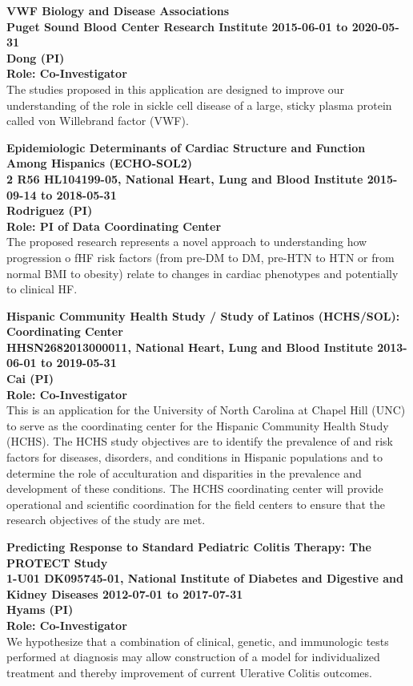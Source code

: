 \documentclass[10pt,letterpaper]{article}
\renewenvironment{itemize}{
  \begin{list}{}{
    \setlength{\leftmargin}{1.5em}
    \setlength{\itemsep}{0.25em}
    \setlength{\parskip}{0pt}
    \setlength{\parsep}{0.25em}
  }
}{
  \end{list}
}
\begin{document}
\begin{itemize}
    \item \textbf{VWF Biology and Disease Associations\\ Puget Sound Blood Center Research Institute 2015-06-01 to 2020-05-31\\ 
    Dong (PI)\\
    Role: Co-Investigator}\\
The studies proposed in this application are designed to improve our understanding of the role in sickle cell disease of a large,
sticky plasma protein called von Willebrand factor (VWF).\\

    \item \textbf{Epidemiologic Determinants of Cardiac Structure and Function Among Hispanics (ECHO-SOL2)\\ 2 R56 HL104199-05, National Heart, Lung and Blood Institute 2015-09-14 to 2018-05-31\\
    Rodriguez (PI)\\
    Role: PI of Data Coordinating Center}\\
    The proposed research represents a novel approach to understanding how progression o fHF risk factors (from pre-DM to DM, pre-HTN to HTN or from normal BMI to obesity) relate to changes in cardiac phenotypes and potentially to clinical HF.\\
    
    \item \textbf{Hispanic Community Health Study / Study of Latinos (HCHS/SOL): Coordinating Center\\HHSN2682013000011, National Heart, Lung and Blood Institute 2013-06-01 to 2019-05-31\\
Cai (PI)\\
Role: Co-Investigator}\\
This is an application for the University of North Carolina at Chapel Hill (UNC) to serve as the coordinating center for the Hispanic Community Health Study (HCHS). The HCHS study objectives are to identify the prevalence of and risk factors for diseases, disorders, and conditions in Hispanic populations and to determine the role of acculturation and disparities in the prevalence and development of these conditions. The HCHS coordinating center will provide operational and scientific coordination for the field centers to ensure that the research objectives of the study are met.\\

        \item \textbf{Predicting Response to Standard Pediatric Colitis Therapy: The PROTECT Study\\1-U01 DK095745-01, National Institute of Diabetes and Digestive and Kidney Diseases 2012-07-01 to 2017-07-31\\
Hyams (PI)\\
Role: Co-Investigator\\}
We hypothesize that a combination of clinical, genetic, and immunologic tests performed at diagnosis may allow construction of a model for individualized treatment and thereby improvement of current Ulerative Colitis outcomes.\\


\end{itemize}
\end{document}
